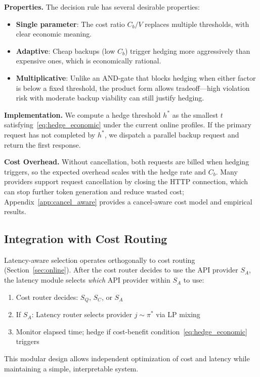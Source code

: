 \textbf{Properties.}
The decision rule has several desirable properties:
\begin{itemize}
    \item \textbf{Single parameter}: The cost ratio $C_b/V$ replaces multiple thresholds, with clear economic meaning.
    \item \textbf{Adaptive}: Cheap backups (low $C_b$) trigger hedging more aggressively than expensive ones, which is economically rational.
    \item \textbf{Multiplicative}: Unlike an AND-gate that blocks hedging when either factor is below a fixed threshold, the product form allows tradeoff---high violation risk with moderate backup viability can still justify hedging.
\end{itemize}

\textbf{Implementation.}
We compute a hedge threshold $h^*$ as the smallest $t$ satisfying~\eqref{eq:hedge_economic} under the current online profiles. If the primary request has not completed by $h^*$, we dispatch a parallel backup request and return the first response.

\textbf{Cost Overhead.}
Without cancellation, both requests are billed when hedging triggers, so the expected overhead scales with the hedge rate and $C_b$. Many providers support request cancellation by closing the HTTP connection, which can stop further token generation and reduce wasted cost; Appendix~\ref{app:cancel_aware} provides a cancel-aware cost model and empirical results.

\subsection{Integration with Cost Routing}

Latency-aware selection operates orthogonally to cost routing (Section~\ref{sec:online}). After the cost router decides to use the API provider $S_A$, the latency module selects \textit{which} API provider within $S_A$ to use:
\begin{enumerate}
    \item Cost router decides: $S_Q$, $S_C$, or $S_A$
    \item If $S_A$: Latency router selects provider $j \sim \pi^*$ via LP mixing
    \item Monitor elapsed time; hedge if cost-benefit condition~\eqref{eq:hedge_economic} triggers
\end{enumerate}

This modular design allows independent optimization of cost and latency while maintaining a simple, interpretable system.
